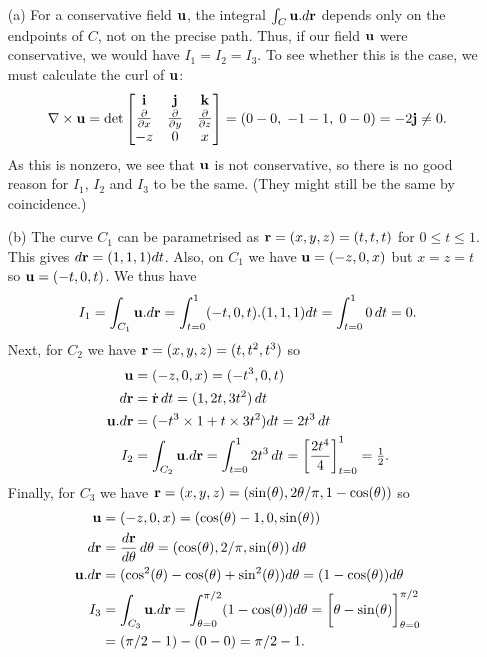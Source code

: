 \documentclass[a4paper]{amsart}
\renewenvironment{solution}{\SolutionInline}{\endSolutionInline}
\begin{document}
\begin{solution}
 \begin{itemize}
  \item[(a)] For a conservative field $\mathbf{u}$, the integral
   $\int_C\mathbf{u}.d\mathbf{r}$ depends only on the endpoints of $C$, not on the
   precise path.  Thus, if our field $\mathbf{u}$ were conservative, we would
   have $I_1=I_2=I_3$.  To see whether this is the case, we must
   calculate the curl of $\mathbf{u}$:
   \[ \nabla\times\mathbf{u} = 
       \det\left[\begin{matrix} \mathbf{i} & \mathbf{j} & \mathbf{k} \\
         \frac{\partial}{\partial x} & \frac{\partial}{\partial y} & \frac{\partial}{\partial z} \\
         -z & 0 & x \end{matrix}\right] =
         (0-0,\;-1-1,\;0-0) = -2\mathbf{j} \neq 0.
   \]
   As this is nonzero, we see that $\mathbf{u}$ is not conservative, so there
   is no good reason for $I_1$, $I_2$ and $I_3$ to be the same.  (They
   might still be the same by coincidence.)
  \item[(b)] The curve $C_1$ can be parametrised as
   $\mathbf{r}=(x,y,z)=(t,t,t)$ for $0\leq t\leq 1$.  This gives
   $d\mathbf{r}=(1,1,1)dt$.  Also, on $C_1$ we have $\mathbf{u}=(-z,0,x)$ but
   $x=z=t$ so $\mathbf{u}=(-t,0,t)$.  We thus have
   \[ I_1 = \int_{C_1}\mathbf{u}.d\mathbf{r} = \int_{t=0}^1 (-t,0,t).(1,1,1)dt 
       = \int_{t=0}^1 0\,dt = 0.
   \]
   Next, for $C_2$ we have $\mathbf{r}=(x,y,z)=(t,t^2,t^3)$ so
   \begin{align*}
    \vu &= (-z,0,x) = (-t^3,0,t) \\
    d\vr &= \dot{\vr}\,dt = (1,2t,3t^2)\,dt \\
    \vu.d\vr &= (-t^3\tm 1 + t\tm 3t^2)dt = 2t^3\,dt \\
    I_2 &= \int_{C_2}\vu.d\vr 
         = \int_{t=0}^1 2 t^3\,dt 
         = \CH{\frac{2t^4}{4}}_{t=0}^1 = \half.
   \end{align*}
   Finally, for $C_3$ we have
   $\mathbf{r}=(x,y,z)=(\sin(\theta),2\theta/\pi,1-\cos(\theta))$ so 
   \begin{align*}
    \vu &= (-z,0,x) = (\cos(\tht)-1,0,\sin(\tht)) \\
    d\vr &= \frac{d\vr}{d\tht}\,d\tht
          = (\cos(\tht),2/\pi,\sin(\tht))\,d\tht \\
    \vu.d\vr &= (\cos^2(\tht)-\cos(\tht)+\sin^2(\tht))d\tht 
              = (1-\cos(\tht))d\tht \\
    I_3 &= \int_{C_3}\vu.d\vr 
         = \int_{\tht=0}^{\pi/2} (1-\cos(\tht))d\tht 
         = \CH{\tht-\sin(\tht)}_{\tht=0}^{\pi/2} \\
        &= (\pi/2-1)-(0-0) = \pi/2-1.
   \end{align*}
 \end{itemize}
\end{solution}
\end{document}
